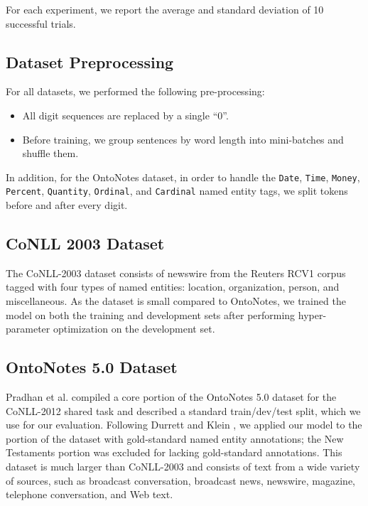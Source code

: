 \documentclass[11pt,letterpaper]{article}
\begin{document}
For each experiment, we report the average and standard deviation of 10 successful trials.

\subsection{Dataset Preprocessing}

For all datasets, we performed the following pre-processing:
\begin{itemize}
\item All digit sequences are replaced by a single ``0''.
\item Before training, we group sentences by word length
into mini-batches and shuffle them.
\end{itemize}
In addition, for the OntoNotes dataset, in order to handle the {\tt Date}, {\tt Time}, {\tt Money}, {\tt Percent}, {\tt Quantity}, {\tt Ordinal}, and {\tt Cardinal} named entity tags, we split tokens before and after every digit.

\subsection{CoNLL 2003 Dataset}

The CoNLL-2003 dataset \cite{conll2003} consists of newswire from the Reuters RCV1 corpus tagged with four types of named entities: location, organization, person, and miscellaneous. As the dataset is small compared to OntoNotes, we trained the model on both the training and development sets after performing hyper-parameter optimization on the development set.




\subsection{OntoNotes 5.0 Dataset}

Pradhan et al.  compiled a core portion of the OntoNotes 5.0 dataset for the CoNLL-2012 shared task and described a standard train/dev/test split, which we use for our evaluation. Following Durrett and Klein , we applied our model to the portion of the dataset with gold-standard named entity annotations; the New Testaments portion was excluded for lacking gold-standard annotations. This dataset is much larger than CoNLL-2003 and consists of text from a wide variety of sources, such as broadcast conversation, broadcast news, newswire, magazine, telephone conversation, and Web text.
\end{document}
